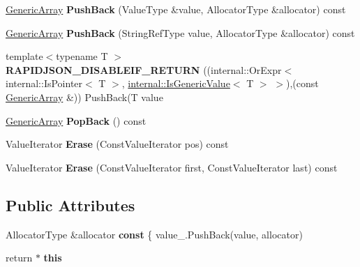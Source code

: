 \begin{DoxyCompactItemize}
\item 
\mbox{\label{a02076_a2ed88f0630c044bad695a127a866c348}} 
\hyperlink{a02076}{Generic\+Array} {\bfseries Push\+Back} (Value\+Type \&value, Allocator\+Type \&allocator) const
\item 
\mbox{\label{a02076_ae599de6aee1167648085672b79dd6bcc}} 
\hyperlink{a02076}{Generic\+Array} {\bfseries Push\+Back} (String\+Ref\+Type value, Allocator\+Type \&allocator) const
\item 
\mbox{\label{a02076_a12adff0c1e11aa3be6f4160015a65df0}} 
{\footnotesize template$<$typename T $>$ }\\{\bfseries R\+A\+P\+I\+D\+J\+S\+O\+N\+\_\+\+D\+I\+S\+A\+B\+L\+E\+I\+F\+\_\+\+R\+E\+T\+U\+RN} ((internal\+::\+Or\+Expr$<$ internal\+::\+Is\+Pointer$<$ T $>$, \hyperlink{a02020}{internal\+::\+Is\+Generic\+Value}$<$ T $>$ $>$),(const \hyperlink{a02076}{Generic\+Array} \&)) Push\+Back(T value
\item 
\mbox{\label{a02076_afd1c75a82d2fc4366cde18256962edf6}} 
\hyperlink{a02076}{Generic\+Array} {\bfseries Pop\+Back} () const
\item 
\mbox{\label{a02076_aefa57a363accf2ade867583771f8a54b}} 
Value\+Iterator {\bfseries Erase} (Const\+Value\+Iterator pos) const
\item 
\mbox{\label{a02076_ac1be0c701ad3aaf0570a8a1ffc715fd5}} 
Value\+Iterator {\bfseries Erase} (Const\+Value\+Iterator first, Const\+Value\+Iterator last) const
\end{DoxyCompactItemize}
\subsection*{Public Attributes}
\begin{DoxyCompactItemize}
\item 
\mbox{\label{a02076_a25d2ed55daa117c41db6a5b3f87e9ddc}} 
Allocator\+Type \&allocator {\bfseries const} \{ value\+\_\+.\+Push\+Back(value, allocator)
\item 
\mbox{\label{a02076_aef8b7baa9ec5cd68d8951fa8bad85217}} 
return $\ast$ {\bfseries this}
\end{DoxyCompactItemize}
